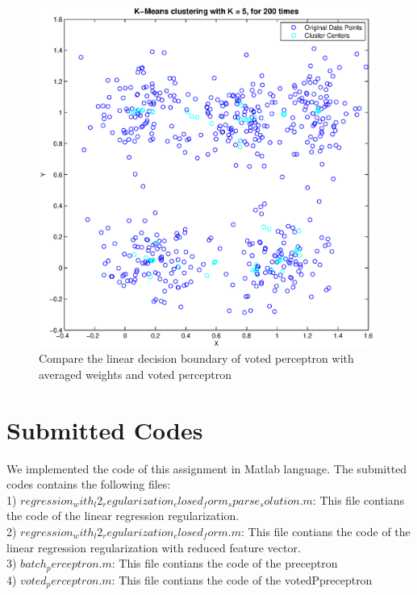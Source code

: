 \documentclass{article} %
\begin{document}
\begin{figure}[h]
\begin{center}
\includegraphics[width=11cm]{Fig/fig_Kmeans_with_random_initialization.eps}
 \end{center}
\caption{\small{Compare the linear decision boundary of voted perceptron with averaged weights and voted perceptron}} 
\label{fig:vote_perceptroncompareW1}
\end{figure}


\section{Submitted Codes}
We implemented the  code of this assignment in Matlab language. The submitted codes contains the following files:\\
 1) $regression_with_l2_regularization_closed_form_sparse_solution.m$: This file contians the code of the linear regression regularization.\\
 2) $regression_with_l2_regularization_closed_form.m$: This file contians the code of the linear regression regularization with reduced feature vector.\\
 3) $batch_perceptron.m$: This file contians the code of the preceptron\\
 4) $voted_perceptron.m$: This file contians the code of the votedPpreceptron\\
 
\end{document}
